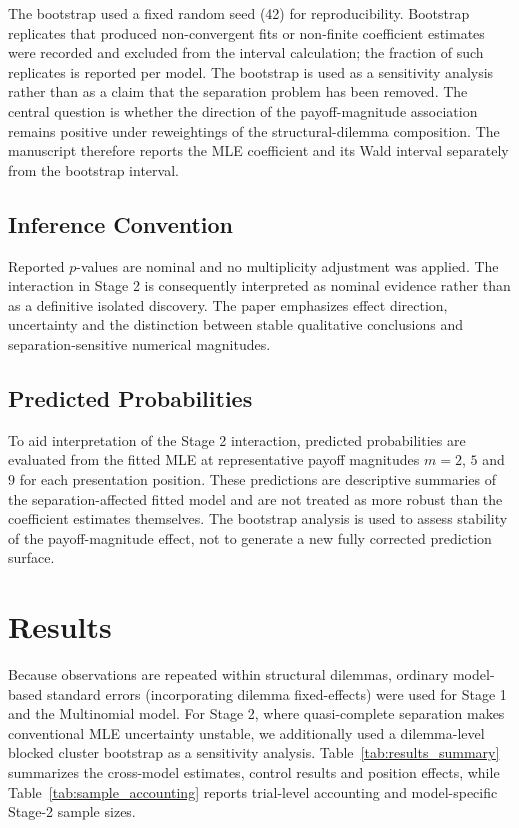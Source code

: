 \documentclass[10pt,journal,compsoc]{IEEEtran}
\begin{document}
The bootstrap used a fixed random seed (42) for reproducibility. Bootstrap replicates that produced non-convergent fits or non-finite coefficient estimates were recorded and excluded from the interval calculation; the fraction of such replicates is reported per model. The bootstrap is used as a sensitivity analysis rather than as a claim that the separation problem has been removed. The central question is whether the direction of the payoff-magnitude association remains positive under reweightings of the structural-dilemma composition. The manuscript therefore reports the MLE coefficient and its Wald interval separately from the bootstrap interval.

\subsection{Inference Convention}
Reported $p$-values are nominal and no multiplicity adjustment was applied. The interaction in Stage 2 is consequently interpreted as nominal evidence rather than as a definitive isolated discovery. The paper emphasizes effect direction, uncertainty and the distinction between stable qualitative conclusions and separation-sensitive numerical magnitudes.

\subsection{Predicted Probabilities}
To aid interpretation of the Stage 2 interaction, predicted probabilities are evaluated from the fitted MLE at representative payoff magnitudes $m=2$, $5$ and $9$ for each presentation position. These predictions are descriptive summaries of the separation-affected fitted model and are not treated as more robust than the coefficient estimates themselves. The bootstrap analysis is used to assess stability of the payoff-magnitude effect, not to generate a new fully corrected prediction surface.

\section{Results}
\label{sec:results}

Because observations are repeated within structural dilemmas, ordinary model-based standard errors (incorporating dilemma fixed-effects) were used for Stage 1 and the Multinomial model. For Stage 2, where quasi-complete separation makes conventional MLE uncertainty unstable, we additionally used a dilemma-level blocked cluster bootstrap as a sensitivity analysis. Table~\ref{tab:results_summary} summarizes the cross-model estimates, control results and position effects, while Table~\ref{tab:sample_accounting} reports trial-level accounting and model-specific Stage-2 sample sizes.
\end{document}
